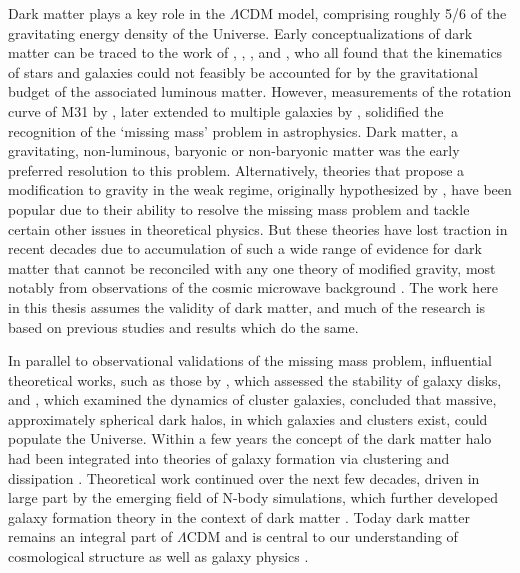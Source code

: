Dark matter plays a key role in the $\Lambda$CDM model, comprising roughly 5/6 of the gravitating energy density of the Universe. Early conceptualizations of dark matter can be traced to the work of \textcite{kapteyn1922}, \textcite{oort32}, \textcite{zwicky33}, and \textcite{babcock39}, who all found that the kinematics of stars and galaxies could not feasibly be accounted for by the gravitational budget of the associated luminous matter. However, measurements of the rotation curve of M31 by \textcite{rubin70}, later extended to multiple galaxies by \textcite{rubin80}, solidified the recognition of the `missing mass' problem in astrophysics. Dark matter, a gravitating, non-luminous, baryonic or non-baryonic matter was the early preferred resolution to this problem. Alternatively, theories that propose a modification to gravity in the weak regime, originally hypothesized by \textcite{milgrom83}, have been popular due to their ability to resolve the missing mass problem and tackle certain other issues in theoretical physics. But these theories have lost traction in recent decades due to accumulation of such a wide range of evidence for dark matter that cannot be reconciled with any one theory of modified gravity, most notably from observations of the cosmic microwave background \parencite{netterfield02}. The work here in this thesis assumes the validity of dark matter, and much of the research is based on previous studies and results which do the same.

In parallel to observational validations of the missing mass problem, influential theoretical works, such as those by \textcite{ostriker73}, which assessed the stability of galaxy disks, and \textcite{einasto74}, which examined the dynamics of cluster galaxies, concluded that massive, approximately spherical dark halos, in which galaxies and clusters exist, could populate the Universe. Within a few years the concept of the dark matter halo had been integrated into theories of galaxy formation via clustering and dissipation \parencite{white78}. Theoretical work continued over the next few decades, driven in large part by the emerging field of N-body simulations, which further developed galaxy formation theory in the context of dark matter \parencite{white91}. Today dark matter remains an integral part of $\Lambda$CDM and is central to our understanding of cosmological structure as well as galaxy physics \parencite[e.g.][]{frenk12}.

